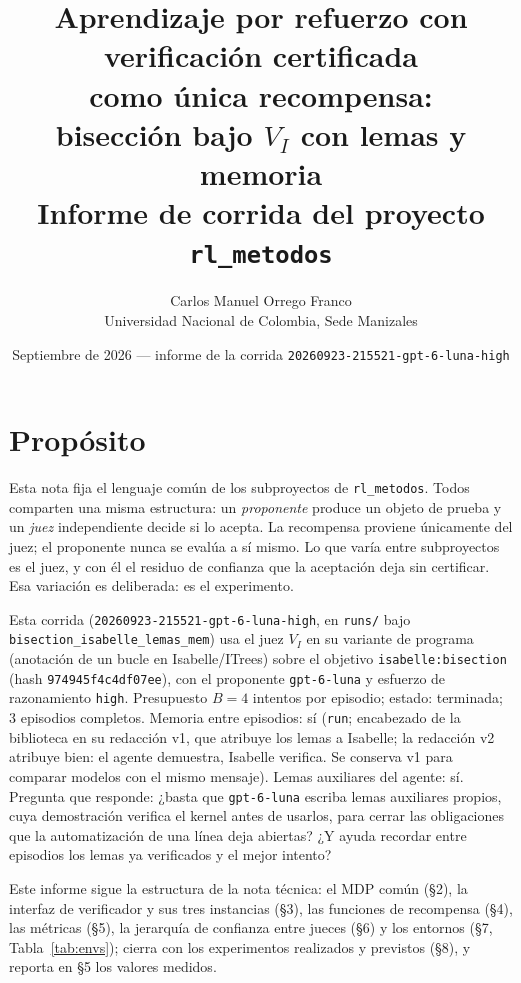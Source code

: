 \documentclass[11pt,a4paper]{article}
\title{Aprendizaje por refuerzo con verificación certificada\\como única recompensa:\\bisección bajo $V_I$ con lemas y memoria\\[0.4em]\large Informe de corrida del proyecto \texttt{rl\_metodos}}
\author{Carlos Manuel Orrego Franco\\Universidad Nacional de Colombia, Sede Manizales}
\date{Septiembre de 2026 --- informe de la corrida \texttt{20260923-\allowbreak{}215521-\allowbreak{}gpt-\allowbreak{}6-\allowbreak{}luna-\allowbreak{}high}}
\begin{document}
\maketitle

\section{Propósito}

Esta nota fija el lenguaje común de los subproyectos de \texttt{rl\_metodos}. Todos comparten una misma estructura: un \emph{proponente} produce un objeto de prueba y un \emph{juez} independiente decide si lo acepta. La recompensa proviene únicamente del juez; el proponente nunca se evalúa a sí mismo. Lo que varía entre subproyectos es el juez, y con él el residuo de confianza que la aceptación deja sin certificar. Esa variación es deliberada: es el experimento.

{\sloppy Esta corrida (\texttt{20260923-\allowbreak{}215521-\allowbreak{}gpt-\allowbreak{}6-\allowbreak{}luna-\allowbreak{}high}, en \texttt{runs/} bajo \texttt{bisection\_\allowbreak{}isabelle\_\allowbreak{}lemas\_\allowbreak{}mem}) usa el juez $V_I$ en su variante de programa (anotación de un bucle en Isabelle/ITrees) sobre el objetivo \texttt{isabelle:\allowbreak{}bisection} (hash \texttt{974945f4c4df07ee}), con el proponente \texttt{gpt-\allowbreak{}6-\allowbreak{}luna} y esfuerzo de razonamiento \texttt{high}. Presupuesto $B = 4$ intentos por episodio; estado: terminada; 3 episodios completos. Memoria entre episodios: sí (\texttt{run}; encabezado de la biblioteca en su redacción v1, que atribuye los lemas a Isabelle; la redacción v2 atribuye bien: el agente demuestra, Isabelle verifica. Se conserva v1 para comparar modelos con el mismo mensaje). Lemas auxiliares del agente: sí. Pregunta que responde: ¿basta que \texttt{gpt-\allowbreak{}6-\allowbreak{}luna} escriba lemas auxiliares propios, cuya demostración verifica el kernel antes de usarlos, para cerrar las obligaciones que la automatización de una línea deja abiertas? ¿Y ayuda recordar entre episodios los lemas ya verificados y el mejor intento?\par}

Este informe sigue la estructura de la nota técnica: el MDP común (§2), la interfaz de verificador y sus tres instancias (§3), las funciones de recompensa (§4), las métricas (§5), la jerarquía de confianza entre jueces (§6) y los entornos (§7, Tabla~\ref{tab:envs}); cierra con los experimentos realizados y previstos (§8), y reporta en §5 los valores medidos.
\end{document}
